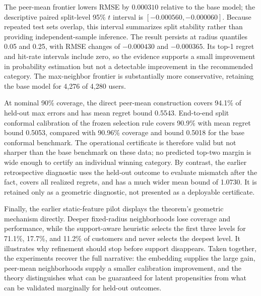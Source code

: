 \documentclass[11pt]{article}
\theoremstyle{noteplain}
\theoremstyle{definition}
\begin{document}
The peer-mean frontier lowers RMSE by $0.000310$ relative to the base model; the descriptive paired split-level 95\% $t$ interval is $[-0.000560,-0.000060]$. Because repeated test sets overlap, this interval summarizes split stability rather than providing independent-sample inference. The result persists at radius quantiles 0.05 and 0.25, with RMSE changes of $-0.000430$ and $-0.000365$. Its top-1 regret and hit-rate intervals include zero, so the evidence supports a small improvement in probability estimation but not a detectable improvement in the recommended category. The max-neighbor frontier is substantially more conservative, retaining the base model for 4,276 of 4,280 users.

At nominal 90\% coverage, the direct peer-mean construction covers 94.1\% of held-out max errors and has mean regret bound 0.5543. End-to-end split conformal calibration of the frozen selection rule covers 90.9\% with mean regret bound 0.5053, compared with 90.96\% coverage and bound 0.5018 for the base conformal benchmark. The operational certificate is therefore valid but not sharper than the base benchmark on these data; no predicted top-two margin is wide enough to certify an individual winning category. By contrast, the earlier retrospective diagnostic uses the held-out outcome to evaluate mismatch after the fact, covers all realized regrets, and has a much wider mean bound of 1.0730. It is retained only as a geometric diagnostic, not presented as a deployable certificate.

Finally, the earlier static-feature pilot displays the theorem's geometric mechanism directly. Deeper fixed-radius neighborhoods lose coverage and performance, while the support-aware heuristic selects the first three levels for 71.1\%, 17.7\%, and 11.2\% of customers and never selects the deepest level. It illustrates why refinement should stop before support disappears. Taken together, the experiments recover the full narrative: the embedding supplies the large gain, peer-mean neighborhoods supply a smaller calibration improvement, and the theory distinguishes what can be guaranteed for latent propensities from what can be validated marginally for held-out outcomes.
\end{document}
